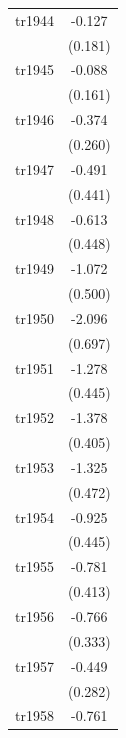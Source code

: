 \begin{table}[htbp]
\begin{tabular}{l*{1}{c}}
\addlinespace
tr1944              &      -0.127         \\
                    &     (0.181)         \\
\addlinespace
tr1945              &      -0.088         \\
                    &     (0.161)         \\
\addlinespace
tr1946              &      -0.374         \\
                    &     (0.260)         \\
\addlinespace
tr1947              &      -0.491         \\
                    &     (0.441)         \\
\addlinespace
tr1948              &      -0.613         \\
                    &     (0.448)         \\
\addlinespace
tr1949              &      -1.072\sym{**} \\
                    &     (0.500)         \\
\addlinespace
tr1950              &      -2.096\sym{***}\\
                    &     (0.697)         \\
\addlinespace
tr1951              &      -1.278\sym{***}\\
                    &     (0.445)         \\
\addlinespace
tr1952              &      -1.378\sym{***}\\
                    &     (0.405)         \\
\addlinespace
tr1953              &      -1.325\sym{***}\\
                    &     (0.472)         \\
\addlinespace
tr1954              &      -0.925\sym{**} \\
                    &     (0.445)         \\
\addlinespace
tr1955              &      -0.781\sym{*}  \\
                    &     (0.413)         \\
\addlinespace
tr1956              &      -0.766\sym{**} \\
                    &     (0.333)         \\
\addlinespace
tr1957              &      -0.449         \\
                    &     (0.282)         \\
\addlinespace
tr1958              &      -0.761\sym{*}  \\

\end{tabular}
\end{table}
